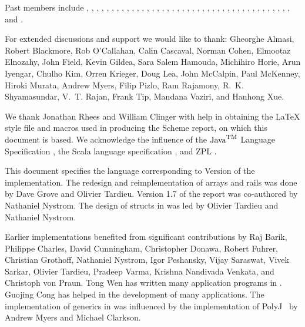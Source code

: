 Past members include
, 
, 
, 
, 
, 
, 
, 
, 
, 
,
, 
, 
,
,
,
, 
, 
, 
, 
, 
, 
, 
, 
,
, 
,
, 
,
,  
, 
, 
, 
, 
,
,
, 
,
, 
, 
, 
, and
.


For extended discussions and support we would like to thank: 
Gheorghe Almasi,
Robert Blackmore,
Rob O'Callahan, 
Calin Cascaval, 
Norman Cohen, 
Elmootaz Elnozahy, 
John Field,
Kevin Gildea,
Sara Salem Hamouda,
Michihiro Horie,
Arun Iyengar,
Chulho Kim,
Orren Krieger, 
Doug Lea, 
John McCalpin, 
Paul McKenney, 
Hiroki Murata,
Andrew Myers,
Filip Pizlo, 
Ram Rajamony,
R.~K. Shyamasundar, 
V.~T. Rajan, 
Frank Tip,
Mandana Vaziri,
and
Hanhong Xue.


We thank Jonathan Rhees and William Clinger with help in obtaining the
\LaTeX{} style file and macros used in producing the Scheme report,
on which this document is based. We acknowledge the influence of
the $\mbox{Java}^{\mbox{\textsc{tm}}}$ Language
Specification \cite{jls2}, the Scala language specification
\cite{scala-spec}, and ZPL \cite{zpl}.

This document specifies the language corresponding to Version
\integerversion{} of the implementation. The redesign and reimplementation of arrays and rails was  done by Dave Grove and Olivier Tardieu.
 Version 1.7 of the report was co-authored by Nathaniel Nystrom. The design of structs in \Xten{} was led by Olivier Tardieu and Nathaniel Nystrom.

Earlier implementations benefited from significant contributions by
Raj Barik, 
Philippe Charles, 
David Cunningham,
Christopher Donawa, 
Robert Fuhrer,
Christian Grothoff,
Nathaniel Nystrom,  
Igor Peshansky,  
Vijay Saraswat,
Vivek Sarkar, 
Olivier Tardieu,  
Pradeep Varma, 
Krishna Nandivada Venkata, and
Christoph von Praun.
Tong Wen has written many application programs
in \Xten{}. Guojing Cong has helped in the
development of many applications.
The implementation of generics in \Xten{} was influenced by the
implementation of PolyJ~\cite{polyj} by Andrew Myers and Michael Clarkson.
